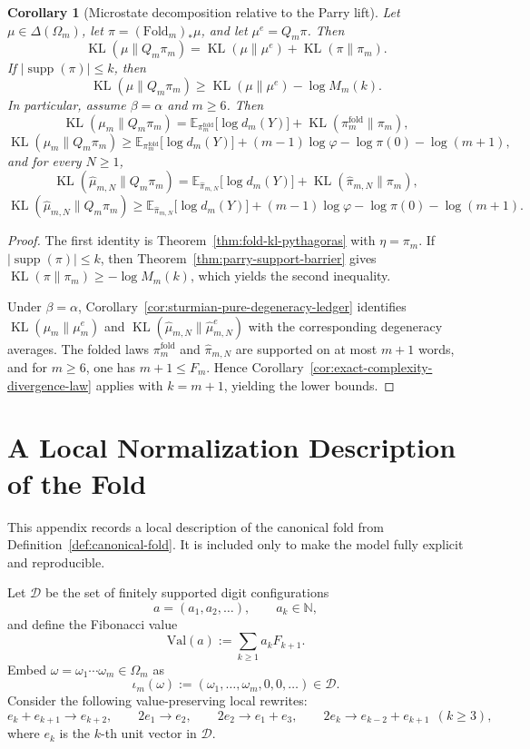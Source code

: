 \documentclass[11pt,letterpaper]{article}
\numberwithin{equation}{section}
\theoremstyle{plain}
\newtheorem{corollary}[theorem]{Corollary}
\theoremstyle{definition}
\theoremstyle{remark}
\newcommand{\Fold}{\mathrm{Fold}}
\DeclareMathOperator{\KL}{KL}
\DeclareMathOperator{\supp}{supp}
\begin{document}
\begin{corollary}[Microstate decomposition relative to the Parry lift]\label{cor:microstate-parry-lift-decomposition}
Let \(\mu\in\Delta(\Omega_m)\), let \(\pi=(\Fold_m)_*\mu\), and let
\(\mu^e=Q_m\pi\). Then
\[
\KL(\mu\|Q_m\pi_m)
=
\KL(\mu\|\mu^e)+\KL(\pi\|\pi_m).
\]
If \(|\supp(\pi)|\le k\), then
\[
\KL(\mu\|Q_m\pi_m)
\ge
\KL(\mu\|\mu^e)-\log M_m(k).
\]
In particular, assume \(\beta=\alpha\) and \(m\ge 6\). Then
\[
\KL(\mu_m\|Q_m\pi_m)
=
\mathbb E_{\pi_m^{\mathrm{fold}}}\big[\log d_m(Y)\big]
+\KL(\pi_m^{\mathrm{fold}}\|\pi_m),
\]
\[
\KL(\mu_m\|Q_m\pi_m)
\ge
\mathbb E_{\pi_m^{\mathrm{fold}}}\big[\log d_m(Y)\big]
+(m-1)\log\varphi-\log\pi(0)-\log(m+1),
\]
and for every \(N\ge 1\),
\[
\KL(\hat\mu_{m,N}\|Q_m\pi_m)
=
\mathbb E_{\hat\pi_{m,N}}\big[\log d_m(Y)\big]
+\KL(\hat\pi_{m,N}\|\pi_m),
\]
\[
\KL(\hat\mu_{m,N}\|Q_m\pi_m)
\ge
\mathbb E_{\hat\pi_{m,N}}\big[\log d_m(Y)\big]
+(m-1)\log\varphi-\log\pi(0)-\log(m+1).
\]
\end{corollary}

\begin{proof}
The first identity is Theorem~\ref{thm:fold-kl-pythagoras} with \(\eta=\pi_m\).
If \(|\supp(\pi)|\le k\), then
Theorem~\ref{thm:parry-support-barrier} gives
\(\KL(\pi\|\pi_m)\ge -\log M_m(k)\), which yields the second inequality.

Under \(\beta=\alpha\), Corollary~\ref{cor:sturmian-pure-degeneracy-ledger}
identifies \(\KL(\mu_m\|\mu_m^e)\) and \(\KL(\hat\mu_{m,N}\|\hat\mu_{m,N}^e)\)
with the corresponding degeneracy averages. The folded laws
\(\pi_m^{\mathrm{fold}}\) and \(\hat\pi_{m,N}\) are supported on at most \(m+1\)
words, and for \(m\ge 6\), one has \(m+1\le F_m\). Hence
Corollary~\ref{cor:exact-complexity-divergence-law} applies with \(k=m+1\),
yielding the lower bounds.
\end{proof}

\section{A Local Normalization Description of the Fold}\label{app:canonical-fold}

This appendix records a local description of the canonical fold from
Definition~\ref{def:canonical-fold}. It is included only to make the model
fully explicit and reproducible.

Let \(\mathcal{D}\) be the set of finitely supported digit configurations
\[
a=(a_1,a_2,\dots),\qquad a_k\in\mathbb{N},
\]
and define the Fibonacci value
\[
\mathrm{Val}(a):=\sum_{k\ge 1} a_k F_{k+1}.
\]
Embed \(\omega=\omega_1\cdots \omega_m\in\Omega_m\) as
\[
\iota_m(\omega):=(\omega_1,\dots,\omega_m,0,0,\dots)\in\mathcal{D}.
\]
Consider the following value-preserving local rewrites:
\[
e_k+e_{k+1}\to e_{k+2},
\qquad
2e_1\to e_2,
\qquad
2e_2\to e_1+e_3,
\qquad
2e_k\to e_{k-2}+e_{k+1}\ \ (k\ge 3),
\]
where \(e_k\) is the \(k\)-th unit vector in \(\mathcal{D}\).
\end{document}
